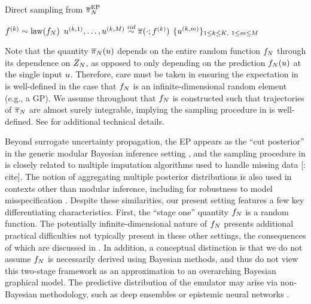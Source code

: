 \documentclass[12pt]{article}
\begin{document}
\begin{algorithm}
    \caption{Direct sampling from $\overline{\pi}_{N}^{\mathrm{EP}}$}
    \label{alg:ep}
    \begin{algorithmic}[1]
        		\State $f^{(k)} \sim \mathrm{law}(f_{N})$ 
		\State $u^{(k, 1)}, \dots, u^{(k, M)} \overset{iid}{\sim} \overline{\pi}(\cdot; f^{(k)})$ 
	\EndFor
	\State \Return $\{u^{(k, m)}\}_{1 \leq k \leq K, \ 1 \leq m \leq M}$
	\EndFunction
    \end{algorithmic}
\end{algorithm}

Note that the quantity $\overline{\pi}_{N}(u)$ depends on the entire random function $f_{N}$ 
through its dependence on $Z_{N}$, as opposed to only depending on the prediction 
$f_{N}(u)$ at the single input $u$. Therefore, care must be taken in ensuring the 
expectation in  is well-defined in the case that $f_{N}$ is an infinite-dimensional
random element (e.g., a GP). We assume throughout that $f_{N}$ is constructed such that 
trajectories of $\overline{\pi}_{N}$ are almost surely integrable, implying the sampling procedure
in  is well-defined. See 
\citet{StuartTeck1,StuartTeck2,random_fwd_models,garegnani2021NoisyMCMC} for additional
technical details. 

Beyond surrogate uncertainty propagation, the EP appears as the ``cut posterior'' in the generic
modular Bayesian inference setting \citep{PlummerCut}, and the sampling procedure in 
 is closely related to multiple imputation algorithms used to handle missing data [\todo: cite].
The notion of aggregating multiple posterior distributions is also used in contexts other than
modular inference, including for robustness to model misspecification \citep{BayesBag,BayesBag2}. 
Despite these similarities, our present setting features a few key differentiating characteristics.
First, the ``stage one'' quantity $f_{N}$ is a random function. The potentially infinite-dimensional 
nature of $f_{N}$ presents additional practical difficulties not typically present in these other 
settings, the consequences of which are discussed in .
In addition, a conceptual distinction is that we do not assume $f_{N}$ is necessarily derived 
using Bayesian methods, and thus do not view this two-stage framework as an approximation to 
an overarching Bayesian graphical model. The predictive distribution of the emulator may arise 
via non-Bayesian methodology, such as deep ensembles \citep{deepEnsembles} or 
epistemic neural networks \citep{epistemicNN,BayesOptEpistemicNN}. 
\end{document}
